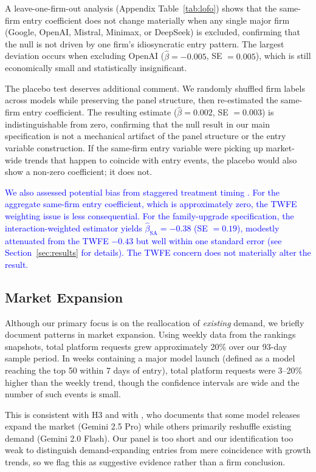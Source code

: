 \documentclass[11pt, a4paper]{article}
\begin{document}
A leave-one-firm-out analysis (Appendix Table~\ref{tab:lofo}) shows that the same-firm entry coefficient does not change materially when any single major firm (Google, OpenAI, Mistral, Minimax, or DeepSeek) is excluded, confirming that the null is not driven by one firm's idiosyncratic entry pattern. The largest deviation occurs when excluding OpenAI ($\hat{\beta} = -0.005$, SE $= 0.005$), which is still economically small and statistically insignificant.

The placebo test deserves additional comment. We randomly shuffled firm labels across models while preserving the panel structure, then re-estimated the same-firm entry coefficient. The resulting estimate ($\hat{\beta} = 0.002$, SE $= 0.003$) is indistinguishable from zero, confirming that the null result in our main specification is not a mechanical artifact of the panel structure or the entry variable construction. If the same-firm entry variable were picking up market-wide trends that happen to coincide with entry events, the placebo would also show a non-zero coefficient; it does not.

\textcolor{blue}{We also assessed potential bias from staggered treatment timing \citep{dechaisemartin2020twoway, goodmanbacon2021}. For the aggregate same-firm entry coefficient, which is approximately zero, the TWFE weighting issue is less consequential. For the family-upgrade specification, the \citet{sunAbraham2021} interaction-weighted estimator yields $\hat{\beta}_{\text{SA}} = -0.38$ (SE $= 0.19$), modestly attenuated from the TWFE $-0.43$ but well within one standard error (see Section~\ref{sec:results} for details). The TWFE concern does not materially alter the result.}

\subsection{Market Expansion}

Although our primary focus is on the reallocation of \emph{existing} demand, we briefly document patterns in market expansion. Using weekly data from the rankings snapshots, total platform requests grew approximately 20\% over our 93-day sample period. In weeks containing a major model launch (defined as a model reaching the top 50 within 7 days of entry), total platform requests were 3--20\% higher than the weekly trend, though the confidence intervals are wide and the number of such events is small.

This is consistent with H3 and with \citet{fradkin2025demand}, who documents that some model releases expand the market (Gemini 2.5 Pro) while others primarily reshuffle existing demand (Gemini 2.0 Flash). Our panel is too short and our identification too weak to distinguish demand-expanding entries from mere coincidence with growth trends, so we flag this as suggestive evidence rather than a firm conclusion.
\end{document}
